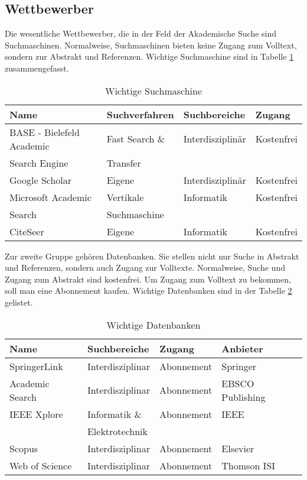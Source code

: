 \subsection{Wettbewerber}
Die wesentliche Wettbewerber, die in der Feld der Akademische Suche sind Suchmaschinen. Normalweise, Suchmaschinen bieten keine Zugang zum Volltext, sondern zur Abstrakt und Referenzen. Wichtige Suchmaschine sind in Tabelle \ref{tab:wettSuch} zusammengefasst.  
\begin{table}[h]
  \centering
  \begin{tabular}{|l|l|l|l|}\hline
   \textbf{Name} &  \textbf{Suchverfahren} &  \textbf{Suchbereiche} &   \textbf{Zugang} \\ \hline
BASE - Bielefeld Academic  & Fast Search \& & Interdisziplinär & Kostenfrei \\
Search Engine & Transfer  & & \\ \hline
 Google Scholar & Eigene & Interdisziplinär & Kostenfrei\\\hline
 Microsoft Academic & Vertikale & Informatik & Kostenfrei \\
 Search & Suchmaschine & & \\ \hline
 CiteSeer & Eigene & Informatik & Kostenfrei \\ \hline
  \end{tabular}
  \caption{Wichtige Suchmaschine}
  \label{tab:wettSuch}
\end{table} 

Zur zweite Gruppe gehören Datenbanken. Sie stellen nicht nur Suche in Abstrakt und Referenzen, sondern auch Zugang zur Volltexte. Normalweise, Suche und Zugang zum Abstrakt sind kostenfrei. Um Zugang zum Volltext zu bekommen, soll man eine Abonnement kaufen. Wichtige Datenbanken sind in der Tabelle \ref{tab:wettDaten} gelistet. 

\begin{table}[h]
  \centering
  \begin{tabular}{|l|l|l|l|}\hline
  \textbf{Name} &  \textbf{Suchbereiche} &  \textbf{Zugang} &  \textbf{Anbieter} \\ \hline
 SpringerLink & Interdisziplinar & Abonnement & Springer\\ \hline
 Academic Search & Interdisziplinar & Abonnement & EBSCO Publishing\\ \hline
 IEEE Xplore & Informatik \& & Abonnement & IEEE\\ 
 & Elektrotechnik & & \\ \hline
 Scopus & Interdisziplinar & Abonnement & Elsevier\\ \hline
 Web of Science & Interdisziplinar & Abonnement & Thomson ISI \\ \hline
  \end{tabular} 
  \caption{Wichtige Datenbanken}
  \label{tab:wettDaten}
\end{table} 




